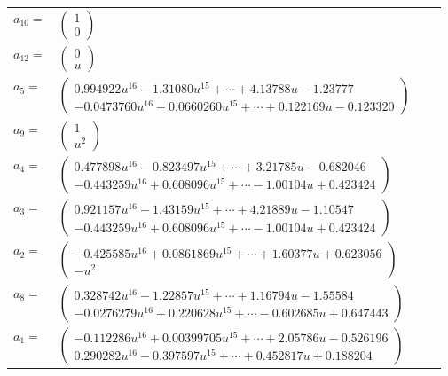 \documentclass[1p]{elsarticle_modified}
\theoremstyle{definition}
\begin{document}
\begin{tabular}{m{7pt} m{180pt} m{7pt} m{180pt} }
\flushright $a_{10}=$&$\begin{pmatrix}1\\0\end{pmatrix}$ \\
\flushright $a_{12}=$&$\begin{pmatrix}0\\u\end{pmatrix}$ \\
\flushright $a_{5}=$&$\begin{pmatrix}0.994922 u^{16}-1.31080 u^{15}+\cdots+4.13788 u-1.23777\\-0.0473760 u^{16}-0.0660260 u^{15}+\cdots+0.122169 u-0.123320\end{pmatrix}$ \\
\flushright $a_{9}=$&$\begin{pmatrix}1\\u^2\end{pmatrix}$ \\
\flushright $a_{4}=$&$\begin{pmatrix}0.477898 u^{16}-0.823497 u^{15}+\cdots+3.21785 u-0.682046\\-0.443259 u^{16}+0.608096 u^{15}+\cdots-1.00104 u+0.423424\end{pmatrix}$ \\
\flushright $a_{3}=$&$\begin{pmatrix}0.921157 u^{16}-1.43159 u^{15}+\cdots+4.21889 u-1.10547\\-0.443259 u^{16}+0.608096 u^{15}+\cdots-1.00104 u+0.423424\end{pmatrix}$ \\
\flushright $a_{2}=$&$\begin{pmatrix}-0.425585 u^{16}+0.0861869 u^{15}+\cdots+1.60377 u+0.623056\\- u^2\end{pmatrix}$ \\
\flushright $a_{8}=$&$\begin{pmatrix}0.328742 u^{16}-1.22857 u^{15}+\cdots+1.16794 u-1.55584\\-0.0276279 u^{16}+0.220628 u^{15}+\cdots-0.602685 u+0.647443\end{pmatrix}$ \\
\flushright $a_{1}=$&$\begin{pmatrix}-0.112286 u^{16}+0.00399705 u^{15}+\cdots+2.05786 u-0.526196\\0.290282 u^{16}-0.397597 u^{15}+\cdots+0.452817 u+0.188204\end{pmatrix}$ \\

\end{tabular}
\end{document}
